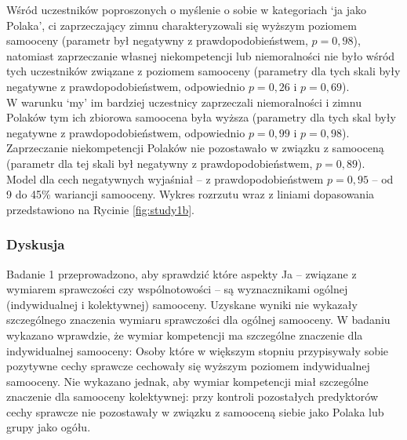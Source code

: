 \documentclass[man]{apa6}
\begin{document}
Wśród uczestników poproszonych o myślenie o sobie w kategoriach `ja jako Polaka', ci zaprzeczający zimnu charakteryzowali się wyższym poziomem samooceny (parametr był negatywny z prawdopodobieństwem, $p = 0,98$), natomiast zaprzeczanie własnej niekompetencji lub niemoralności nie było wśród tych uczestników związane z poziomem samooceny  (parametry dla tych skali były negatywne z prawdopodobieństwem, odpowiednio $p = 0,26$ i $p = 0,69$).\\

W warunku `my' im bardziej uczestnicy zaprzeczali niemoralności i zimnu Polaków tym ich zbiorowa samoocena była wyższa (parametry dla tych skal były negatywne z prawdopodobieństwem, odpowiednio $p = 0,99$ i $p = 0,98$). Zaprzeczanie niekompetencji Polaków nie pozostawało w związku z samooceną (parametr dla tej skali był negatywny z prawdopodobieństwem, $p = 0,89$).\\

Model dla cech negatywnych wyjaśniał -- z prawdopodobieństwem $p = 0,95$ -- od 9 do 45\% wariancji samooceny. Wykres rozrzutu wraz z liniami dopasowania przedstawiono na Rycinie \ref{fig:study1b}.


\begin{figure*}[htbp]
   \centering
   \caption{Przypisywanie sobie (ja vs. ja jako Polak vs. my Polacy) negatywnych cech związanych w wymiarami kompetencji, moralności i ciepła, a poziom samooceny indywidualnej oraz kolektywnej. Punkty oznaczają latentne wyniki dla każdej osoby, natomiast pionowe i poziome kreski oznaczają błędy pomiarowe skal. Grubą linią przerywaną oznaczono najlepsze dopasowanie uzyskane w modelu regresyjnym, z cieńszymi liniami oznaczającymi błąd oszacowania.}
   \label{fig:study1b}
\end{figure*}

\subsubsection{Dyskusja}

Badanie 1 przeprowadzono, aby sprawdzić które aspekty Ja -- związane z wymiarem sprawczości czy wspólnotowości -- są wyznacznikami ogólnej (indywidualnej i kolektywnej) samooceny. Uzyskane wyniki nie wykazały szczególnego znaczenia wymiaru sprawczości dla ogólnej samooceny. W badaniu wykazano wprawdzie, że wymiar kompetencji ma szczególne znaczenie dla indywidualnej samooceny: Osoby które w większym stopniu przypisywały sobie pozytywne cechy sprawcze cechowały się wyższym poziomem indywidualnej samooceny. Nie wykazano jednak, aby wymiar kompetencji miał szczególne znaczenie dla samooceny kolektywnej: przy kontroli pozostałych predyktorów cechy sprawcze nie pozostawały w związku z samooceną siebie jako Polaka lub grupy jako ogółu. \\
\end{document}
